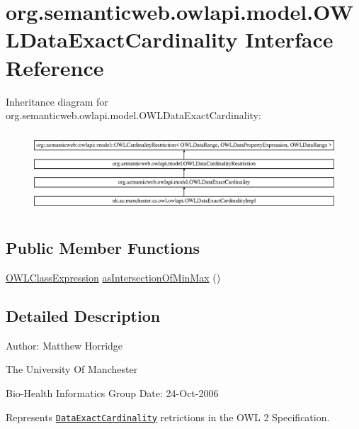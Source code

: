\hypertarget{interfaceorg_1_1semanticweb_1_1owlapi_1_1model_1_1_o_w_l_data_exact_cardinality}{\section{org.\-semanticweb.\-owlapi.\-model.\-O\-W\-L\-Data\-Exact\-Cardinality Interface Reference}
\label{interfaceorg_1_1semanticweb_1_1owlapi_1_1model_1_1_o_w_l_data_exact_cardinality}
}
Inheritance diagram for org.\-semanticweb.\-owlapi.\-model.\-O\-W\-L\-Data\-Exact\-Cardinality\-:\begin{figure}[H]
\begin{center}
\leavevmode
\includegraphics[height=3.031123cm]{interfaceorg_1_1semanticweb_1_1owlapi_1_1model_1_1_o_w_l_data_exact_cardinality}
\end{center}
\end{figure}
\subsection*{Public Member Functions}
\begin{DoxyCompactItemize}
\item 
\hyperlink{interfaceorg_1_1semanticweb_1_1owlapi_1_1model_1_1_o_w_l_class_expression}{O\-W\-L\-Class\-Expression} \hyperlink{interfaceorg_1_1semanticweb_1_1owlapi_1_1model_1_1_o_w_l_data_exact_cardinality_a0cdc60a36094422c6fe68ce85ff012cf}{as\-Intersection\-Of\-Min\-Max} ()
\end{DoxyCompactItemize}


\subsection{Detailed Description}
Author\-: Matthew Horridge\par
 The University Of Manchester\par
 Bio-\/\-Health Informatics Group Date\-: 24-\/\-Oct-\/2006 

Represents \href{http://www.w3.org/TR/2009/REC-owl2-syntax-20091027/#Exact_Cardinality_2}{\tt Data\-Exact\-Cardinality} retrictions in the O\-W\-L 2 Specification. 

